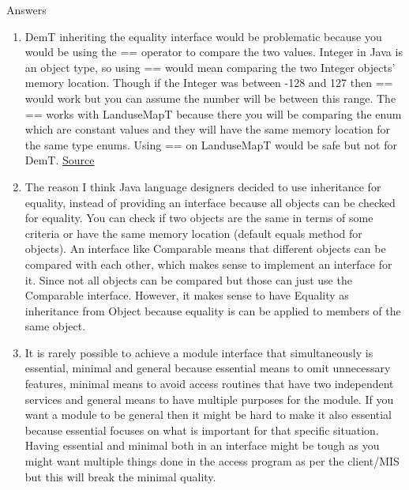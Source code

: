 \documentclass[12pt]{article}
\begin{document}
Answers

\begin{enumerate}
\item DemT inheriting the equality interface would be problematic because you would be using the == operator to compare the two values. Integer in Java is an object type, so using == would mean comparing the two Integer objects' memory location. Though if the Integer was between -128 and 127 then == would work but you can assume the number will be between this range. The == works with LanduseMapT because there you will be comparing the enum which are constant values and they will have the same memory location for the same type enums. Using == on LanduseMapT would be safe but not for DemT. \href{https://stackoverflow.com/questions/3637936/java-integer-equals-vs}{Source}

\item The reason I think Java language designers decided to use inheritance for equality, instead of providing an interface because all objects can be checked for equality. You can check if two objects are the same in terms of some criteria or have the same memory location (default equals method for objects). An interface like Comparable means that different objects can be compared with each other, which makes sense to implement an interface for it. Since not all objects can be compared but those can just use the Comparable interface. However, it makes sense to have Equality as inheritance from Object because equality is can be applied to members of the same object.

\item It is rarely possible to achieve a module interface that simultaneously is essential, minimal and general because essential means to omit unnecessary features, minimal means to avoid access routines that have two independent services and general means to have multiple purposes for the module. If you want a module to be general then it might be hard to make it also essential because essential focuses on what is important for that specific situation. Having essential and minimal both in an interface might be tough as you might want multiple things done in the access program as per the client/MIS but this will break the minimal quality.
\end{enumerate}
\end{document}

